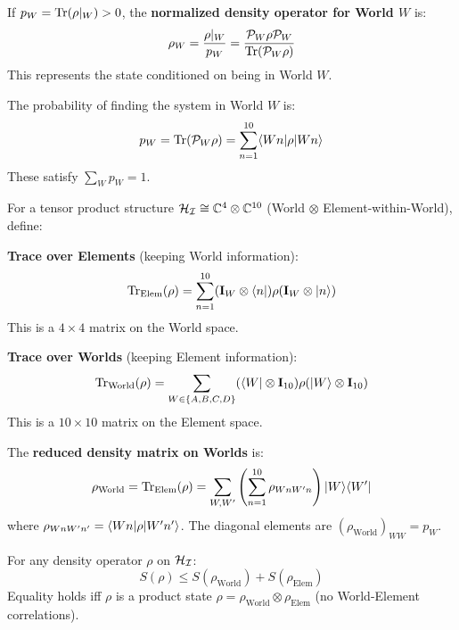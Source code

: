 \begin{definition}
\label{def:normalized-world-state}
If $p_W = \mathrm{Tr}(\rho|_W) > 0$, the \textbf{normalized density operator for World $W$} is:
\[
\rho_W = \frac{\rho|_W}{p_W} = \frac{\mathcal{P}_W \rho \mathcal{P}_W}{\mathrm{Tr}(\mathcal{P}_W \rho)}
\]
This represents the state conditioned on being in World $W$.
\end{definition}

\begin{proposition}
\label{prop:world-probs}
The probability of finding the system in World $W$ is:
\[
p_W = \mathrm{Tr}(\mathcal{P}_W \rho) = \sum_{n=1}^{10} \langle Wn|\rho|Wn\rangle
\]
These satisfy $\sum_W p_W = 1$.
\end{proposition}

\begin{definition}
\label{def:partial-trace-worlds}
For a tensor product structure $\mathcal{H}_{\mathcal{I}} \cong \mathbb{C}^4 \otimes \mathbb{C}^{10}$ (World $\otimes$ Element-within-World), define:

\textbf{Trace over Elements} (keeping World information):
\[
\mathrm{Tr}_{\mathrm{Elem}}(\rho) = \sum_{n=1}^{10} (\mathbf{I}_W \otimes \langle n|) \rho (\mathbf{I}_W \otimes |n\rangle)
\]
This is a $4 \times 4$ matrix on the World space.

\textbf{Trace over Worlds} (keeping Element information):
\[
\mathrm{Tr}_{\mathrm{World}}(\rho) = \sum_{W \in \{A,B,C,D\}} (\langle W| \otimes \mathbf{I}_{10}) \rho (|W\rangle \otimes \mathbf{I}_{10})
\]
This is a $10 \times 10$ matrix on the Element space.
\end{definition}

\begin{proposition}
\label{prop:reduced-world-state}
The \textbf{reduced density matrix on Worlds} is:
\[
\rho_{\mathrm{World}} = \mathrm{Tr}_{\mathrm{Elem}}(\rho) = \sum_{W,W'} \left(\sum_{n=1}^{10} \rho_{WnW'n}\right) |W\rangle\langle W'|
\]
where $\rho_{WnW'n'} = \langle Wn|\rho|W'n'\rangle$. The diagonal elements are $(\rho_{\mathrm{World}})_{WW} = p_W$.
\end{proposition}

\begin{theorem}
\label{thm:info-loss-trace}
For any density operator $\rho$ on $\mathcal{H}_{\mathcal{I}}$:
\[
S(\rho) \leq S(\rho_{\mathrm{World}}) + S(\rho_{\mathrm{Elem}})
\]
Equality holds iff $\rho$ is a product state $\rho = \rho_{\mathrm{World}} \otimes \rho_{\mathrm{Elem}}$ (no World-Element correlations).
\end{theorem}

